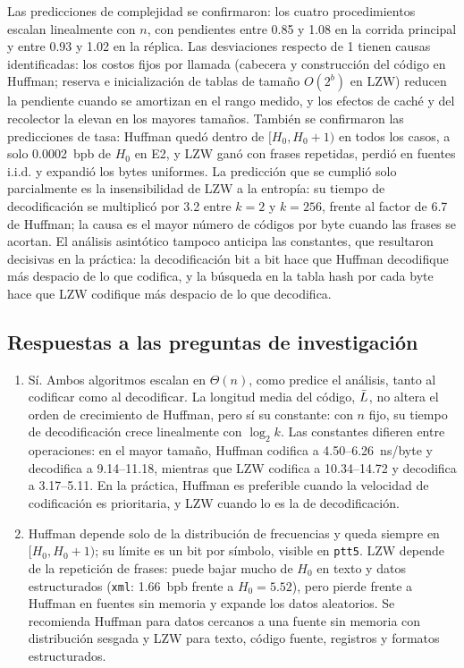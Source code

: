 Las predicciones de complejidad se confirmaron: los cuatro procedimientos escalan linealmente
con $n$, con pendientes entre 0.85 y 1.08 en la corrida principal y entre 0.93 y 1.02 en la
réplica. Las desviaciones respecto de 1 tienen causas identificadas: los costos fijos por
llamada (cabecera y construcción del código en Huffman; reserva e inicialización de tablas de
tamaño $O(2^b)$ en LZW) reducen la pendiente cuando se amortizan en el rango medido, y los
efectos de caché y del recolector la elevan en los mayores tamaños. También se confirmaron las
predicciones de tasa: Huffman quedó dentro de $[H_0, H_0+1)$ en todos los casos, a solo
0.0002~bpb de $H_0$ en E2, y LZW ganó con frases repetidas, perdió en fuentes i.i.d. y expandió
los bytes uniformes. La predicción que se cumplió solo parcialmente es la insensibilidad de LZW a
la entropía: su tiempo de decodificación se multiplicó por 3.2 entre $k = 2$ y $k = 256$, frente al
factor de 6.7 de Huffman; la causa es el mayor número de códigos por byte cuando las frases
se acortan. El análisis asintótico tampoco anticipa las constantes, que resultaron decisivas en
la práctica: la decodificación bit a bit hace que Huffman decodifique más despacio de lo que
codifica, y la búsqueda en la tabla hash por cada byte hace que LZW codifique más despacio de lo
que decodifica.

\subsection{Respuestas a las preguntas de investigación}
\label{sec:concl-rq}
\begin{enumerate}[label=\textbf{RQ\arabic*.}, leftmargin=*]
  \item Sí. Ambos algoritmos escalan en $\Theta(n)$, como predice el análisis, tanto al codificar
        como al decodificar. La longitud media del código, $\bar{L}$, no altera el orden de
        crecimiento de Huffman, pero sí su constante: con $n$ fijo, su tiempo de decodificación
        crece linealmente con $\log_2 k$. Las constantes difieren entre operaciones: en el mayor tamaño,
        Huffman codifica a 4.50--6.26~ns/byte y decodifica a 9.14--11.18, mientras que LZW
        codifica a 10.34--14.72 y decodifica a 3.17--5.11. En la práctica, Huffman es preferible
        cuando la velocidad de codificación es prioritaria, y LZW cuando lo es la de
        decodificación.
  \item Huffman depende solo de la distribución de frecuencias y queda siempre en
        $[H_0, H_0+1)$; su límite es un bit por símbolo, visible en \texttt{ptt5}. LZW depende
        de la repetición de frases: puede bajar mucho de $H_0$ en texto y datos estructurados
        (\texttt{xml}: 1.66~bpb frente a $H_0 = 5.52$), pero pierde frente a Huffman en fuentes
        sin memoria y expande los datos aleatorios. Se recomienda Huffman para datos cercanos a
        una fuente sin memoria con distribución sesgada y LZW para texto, código fuente, registros
        y formatos estructurados.
\end{enumerate}

